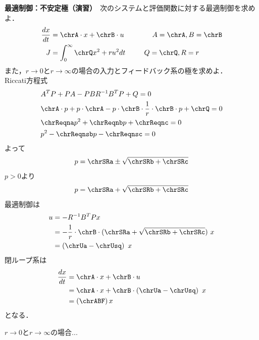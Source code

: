 \noindent
{\bf 最適制御：不安定極（演習）}　次のシステムと評価関数に対する最適制御を求めよ．
\begin{align*}
	\frac{dx}{dt} & = \chrA \cdot x + \chrB \cdot u \ \ \ \ \ \ \ \ \ \ \ \ A=\chrA,B=\chrB\\
	J & = \int_0^{\infty} \chrQ x^2 + r u^2 dt \ \ \ \ \ \ \ \ Q=\chrQ, R=r
\end{align*}
また，$r\rightarrow 0$と$r\rightarrow \infty$の場合の入力とフィードバック系の極を求めよ．
\\

Riccati方程式
\begin{align*}
	& A^T P + P A - P B R^{-1} B^T P + Q = 0 \\
	& \chrA \cdot p + p \cdot \chrA - p \cdot \chrB \cdot \frac{1}{r} \cdot \chrB \cdot p + \chrQ = 0 \\
	& \chrReqna p^2 + \chrReqnb p + \chrReqnc = 0 \\
	& p^2 - \chrReqnsb p - \chrReqnsc = 0
\end{align*}
よって
\begin{align*}
	p = \chrSRa \pm \sqrt{\chrSRb + \chrSRc}
\end{align*}
$p>0$より
\begin{align*}
	p = \chrSRa + \sqrt{\chrSRb + \chrSRc}
\end{align*}
最適制御は
\begin{align*}
	u &= -R^{-1}B^T P x \\
	&= -\frac{1}{r} \cdot \chrB \cdot (\chrSRa + \sqrt{\chrSRb + \chrSRc})\  x \\
	&= \left( \chrUa - \chrUsq \right) \  x  
\end{align*}
閉ループ系は
\begin{align*}
	\frac{dx}{dt} & = \chrA \cdot x + \chrB \cdot u \\
	&= \chrA \cdot x + \chrB \cdot \left( \chrUa - \chrUsq \right) \ x \\
	&= \left( \chrABF \right) x
\end{align*}
となる．

$r\rightarrow 0$と$r\rightarrow \infty$の場合...

